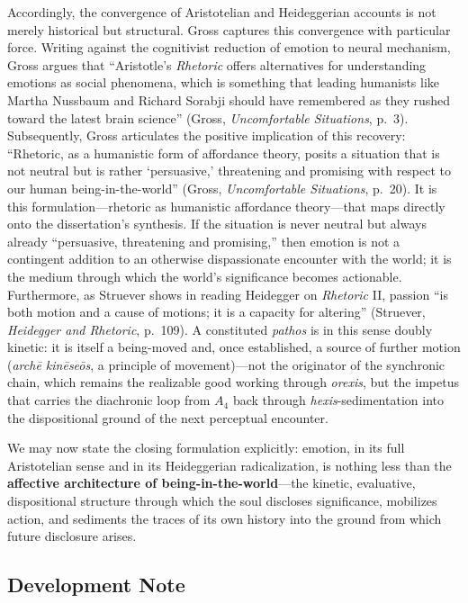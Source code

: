 \documentclass{article}
\begin{document}
Accordingly, the convergence of Aristotelian and Heideggerian accounts is not merely historical but structural. Gross captures this convergence with particular force. Writing against the cognitivist reduction of emotion to neural mechanism, Gross argues that ``Aristotle's \textit{Rhetoric} offers alternatives for understanding emotions as social phenomena, which is something that leading humanists like Martha Nussbaum and Richard Sorabji should have remembered as they rushed toward the latest brain science'' (Gross, \textit{Uncomfortable Situations}, p.~3). Subsequently, Gross articulates the positive implication of this recovery: ``Rhetoric, as a humanistic form of affordance theory, posits a situation that is not neutral but is rather `persuasive,' threatening and promising with respect to our human being-in-the-world'' (Gross, \textit{Uncomfortable Situations}, p.~20). It is this formulation---rhetoric as humanistic affordance theory---that maps directly onto the dissertation's synthesis. If the situation is never neutral but always already ``persuasive, threatening and promising,'' then emotion is not a contingent addition to an otherwise dispassionate encounter with the world; it is the medium through which the world's significance becomes actionable. Furthermore, as Struever shows in reading Heidegger on \textit{Rhetoric} II, passion ``is both motion and a cause of motions; it is a capacity for altering'' (Struever, \textit{Heidegger and Rhetoric}, p.~109). A constituted \textit{pathos} is in this sense doubly kinetic: it is itself a being-moved and, once established, a source of further motion (\textit{archē kinēseōs}, a principle of movement)---not the originator of the synchronic chain, which remains the realizable good working through \textit{orexis}, but the impetus that carries the diachronic loop from $A_4$ back through \textit{hexis}-sedimentation into the dispositional ground of the next perceptual encounter.

We may now state the closing formulation explicitly: emotion, in its full Aristotelian sense and in its Heideggerian radicalization, is nothing less than the \textbf{affective architecture of being-in-the-world}---the kinetic, evaluative, dispositional structure through which the soul discloses significance, mobilizes action, and sediments the traces of its own history into the ground from which future disclosure arises.


\subsection*{Development Note}
\end{document}
